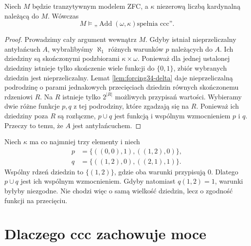 \begin{lemat}
\label{lem:forcing34-add-ccc}
Niech $M$ będzie tranzytywnym modelem
ZFC, a $\kappa$ niezerową liczbą
kardynalną należącą do $M$.
Wówczas
\[
 M\models
 \text{„$\operatorname{Add}(\omega,\kappa)$
       spełnia ccc”}.
\]
\end{lemat}
\begin{proof}
Prowadzimy cały argument wewnątrz $M$.
Gdyby istniał nieprzeliczalny
antyłańcuch $A$, wybralibyśmy
$\aleph_1$ różnych warunków $p$
należących do $A$.
Ich dziedziny są skończonymi
podzbiorami $\kappa\times\omega$.
Ponieważ dla jednej ustalonej
dziedziny istnieje tylko skończenie
wiele funkcji do $\{0,1\}$,
zbiór wybranych dziedzin jest
nieprzeliczalny. Lemat
\ref{lem:forcing34-delta} daje
nieprzeliczalną podrodzinę
o parami jednakowych przecięciach
dziedzin równych skończonemu
rdzeniowi $R$.
Na $R$ istnieje tylko $2^{|R|}$
możliwych przypisań wartości.
Wybieramy dwie różne funkcje
$p,q$ z tej podrodziny,
które zgadzają się na $R$.
Ponieważ ich dziedziny poza $R$
są rozłączne, $p\cup q$ jest
funkcją i wspólnym wzmocnieniem
$p$ i $q$. Przeczy to temu,
że $A$ jest antyłańcuchem.
\end{proof}

\begin{przyklad}
\label{ex:forcing34-compatible}
Niech $\kappa$ ma co najmniej
trzy elementy i niech
\[
\begin{aligned}
p&=\{((0,0),1),((1,2),0)\},\\
q&=\{((1,2),0),((2,1),1)\}.
\end{aligned}
\]
Wspólny rdzeń dziedzin to
$\{(1,2)\}$, gdzie oba warunki
przypisują $0$. Dlatego
$p\cup q$ jest ich wspólnym
wzmocnieniem. Gdyby natomiast
$q(1,2)=1$, warunki byłyby
niezgodne. Nie chodzi więc o
samą wielkość dziedzin, lecz
o zgodność funkcji na przecięciu.
\end{przyklad}

\section{Dlaczego ccc zachowuje moce}

